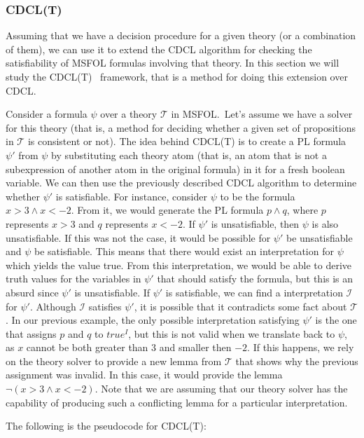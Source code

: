 \subsubsection{CDCL(T)}

Assuming that we have a decision procedure for a given theory (or a combination of them), we can use it to extend the CDCL algorithm for checking the satisfiability of MSFOL formulas involving that theory. In this section we will study the CDCL(T)~\cite{cdcl_t} framework, that is a method for doing this extension over CDCL.\

Consider a formula $\psi$ over a theory $\mathcal{T}$ in MSFOL.\ Let's assume we have a solver for this theory (that is, a method for deciding whether a given set of propositions in $\mathcal{T}$ is consistent or not). The idea behind CDCL(T) is to create a PL formula $\psi'$ from $\psi$ by substituting each theory atom (that is, an atom that is not a subexpression of another atom in the original formula) in it for a fresh boolean variable. We can then use the previously described CDCL algorithm to determine whether $\psi'$ is satisfiable. For instance, consider $\psi$ to be the formula $x > 3 \wedge x < -2$. From it, we would generate the PL formula $p \wedge q$, where $p$ represents $x > 3$ and $q$ represents $x < -2$. If $\psi'$ is unsatisfiable, then $\psi$ is also unsatisfiable. If this was not the case, it would be possible for $\psi'$ be unsatisfiable and $\psi$ be satisfiable. This means that there would exist an interpretation for $\psi$ which yields the value true. From this interpretation, we would be able to derive truth values for the variables in $\psi'$ that should satisfy the formula, but this is an absurd since $\psi'$ is unsatisfiable.
If $\psi'$ is satisfiable, we can find a interpretation $\mathcal{I}$ for $\psi'$. Although $\mathcal{I}$ satisfies $\psi'$, it is possible that it contradicts some fact about $\mathcal{T}$. In our previous example,
the only possible interpretation satisfying $\psi'$ is the one that assigns $p$ and $q$ to $true^{I}$, but this is not valid when we translate back to $\psi$, as $x$ cannot be both greater than $3$ and smaller then $-2$.
 If this happens, we rely on the theory solver to provide a new lemma from $\mathcal{T}$ that shows why the previous assignment was invalid. In this case, it would provide the lemma $\neg (x > 3 \wedge x < -2)$. Note that we are assuming that our theory solver has the capability of producing such a conflicting lemma for a particular interpretation.

The following is the pseudocode for CDCL(T):

